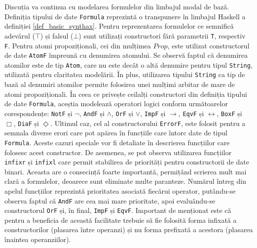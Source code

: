 \documentclass[12pt, openany]{book}
\begin{document}
            \par{}
                Discuția va continua cu modelarea formulelor din limbajul modal de bază. Definiția tipului de date 
                \texttt{Formula} reprezintă o transpunere în limbajul Haskell a definiției \ref{def_basic_synthax}. 
                Pentru reprezentarea formulelor ce semnifică adevărul ($\top$) și falsul ($\bot$) sunt utilizați 
                constructori fără parametrii \texttt{T}, respectiv \texttt{F}. Pentru atomi propoziționali, cei din 
                mulțimea $Prop$, este utilizat constructorul de date \texttt{AtomF} împreună cu denumirea atomului. Se 
                observă faptul că denumirea atomilor este de tip \texttt{Atom}, care nu este decât o altă denumire 
                pentru tipul \texttt{String}, utilizată pentru claritatea modelării. În plus, utilizarea tipului 
                \texttt{String} ca tip de bază al denumiri atomilor permite folosirea unei mulțimi arbitar de mare de 
                atomi propoziționali. În ceea ce privește ceilalți constructori din definiția tipului de date 
                \texttt{Formula}, aceștia modelează operatori logici conform următoarelor corespondențe: \texttt{NotF} 
                și $\neg$, \texttt{AndF} și $\wedge$, \texttt{OrF} și $\vee$, \texttt{ImpF} și $\rightarrow$, 
                \texttt{EqvF} și $\leftrightarrow$, \texttt{BoxF} și $\Box$, \texttt{DiaF} și $\Diamond$. Ultimul caz, 
                cel al constructorului \texttt{ErrorF}, este folosit pentru a semnala diverse erori care pot apărea în 
                funcțiile care întorc date de tipul \texttt{Formula}. Aceste cazuri speciale vor fi detaliate în 
                descrierea funcțiilor care folosesc acest constructor. De asemenea, se pot observa utilizarea funcțiilor 
                \texttt{infixr} și \texttt{infixl} care permit stabilirea de priorități pentru constructorii de date 
                binari. Aceasta are o consecință foarte importantă, permițând scrierea mult mai clară a formulelor, 
                deoarece sunt eliminate multe paranteze. Numărul întreg din apelul funcțiilor reprezintă prioritatea 
                asociată fiecărui operator, putându-se observa faptul că \texttt{AndF} are cea mai mare prioritate, apoi 
                evaluându-se constructorul \texttt{OrF} și, în final, \texttt{ImpF} și \texttt{EqvF}. Important de 
                menționat este că pentru a beneficia de această facilitate trebuie să fie folosită forma infixată a 
                constructorilor (plasarea între operanzi) și nu forma prefixată a acestora (plasarea înaintea 
                operanziilor).
\end{document}
